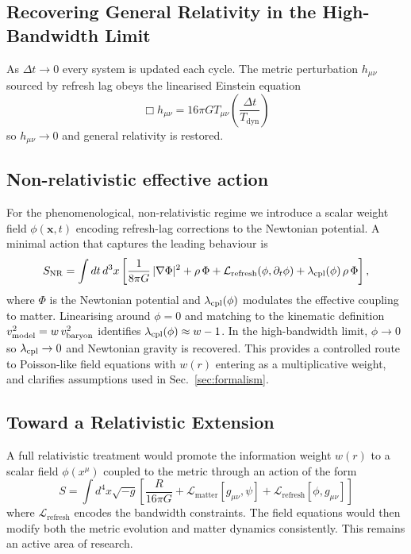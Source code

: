 \documentclass[twocolumn,prd,amsmath,amssymb,aps,superscriptaddress,nofootinbib]{revtex4-2}
\begin{document}
\subsection{Recovering General Relativity in the High-Bandwidth Limit}

As $\Delta t \to 0$ every system is updated each cycle. The metric perturbation $h_{\mu\nu}$ sourced by refresh lag obeys the linearised Einstein equation
\begin{equation}
\Box h_{\mu\nu} = 16\pi G T_{\mu\nu} \left(\frac{\Delta t}{T_{\text{dyn}}}\right)
\end{equation}
so $h_{\mu\nu} \to 0$ and general relativity is restored.

\subsection{Non-relativistic effective action}
\label{sec:nr-action}

For the phenomenological, non-relativistic regime we introduce a scalar weight field $\phi(\mathbf{x},t)$ encoding refresh-lag corrections to the Newtonian potential. A minimal action that captures the leading behaviour is
\begin{equation}
  S_{\rm NR} 
  = \int dt\,d^3x \left[ \frac{1}{8\pi G}\,|\nabla \Phi|^2 
    + \rho\,\Phi 
    + \mathcal{L}_{\rm refresh}(\phi,\partial_t\phi) 
    + \lambda_{\rm cpl}(\phi)\,\rho\,\Phi \right],
\end{equation}
where $\Phi$ is the Newtonian potential and $\lambda_{\rm cpl}(\phi)$ modulates the effective coupling to matter. Linearising around $\phi=0$ and matching to the kinematic definition $v_{\rm model}^2=w\,v_{\rm baryon}^2$ identifies $\lambda_{\rm cpl}(\phi)\approx w-1$. In the high-bandwidth limit, $\phi\to 0$ so $\lambda_{\rm cpl}\to 0$ and Newtonian gravity is recovered. This provides a controlled route to Poisson-like field equations with $w(r)$ entering as a multiplicative weight, and clarifies assumptions used in Sec.~\ref{sec:formalism}.

\subsection{Toward a Relativistic Extension}

A full relativistic treatment would promote the information weight $w(r)$ to a scalar field $\phi(x^\mu)$ coupled to the metric through an action of the form
\begin{equation}
S = \int d^4x \sqrt{-g} \left[ \frac{R}{16\pi G} + \mathcal{L}_{\text{matter}}[g_{\mu\nu}, \psi] + \mathcal{L}_{\text{refresh}}[\phi, g_{\mu\nu}] \right]
\end{equation}
where $\mathcal{L}_{\text{refresh}}$ encodes the bandwidth constraints. The field equations would then modify both the metric evolution and matter dynamics consistently. This remains an active area of research.
\end{document}
